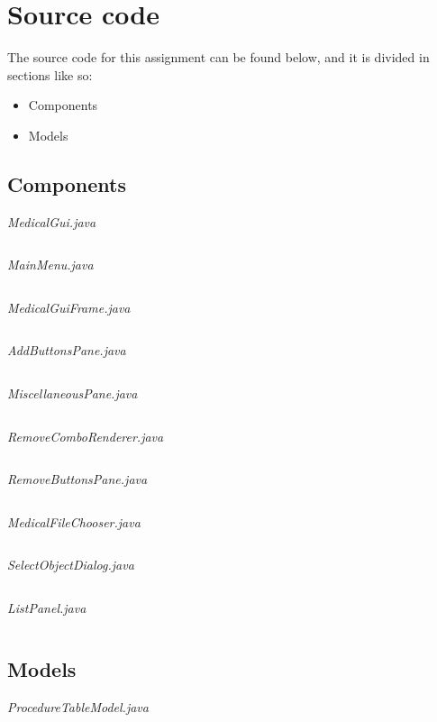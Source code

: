 \documentclass{article}
\begin{document}
\section{Source code}%
\label{sec:source_code}
The source code for this assignment can be found below, and it is divided in sections like so:
\begin{itemize}
  \item Components
  \item Models
\end{itemize}

\subsection{Components}\label{subsec:components} %
\textit{MedicalGui.java}
\inputminted{java}{./src/main/java/com/yvesstraten/medicalconsolegui/MedicalGui.java}

\textit{MainMenu.java}
\inputminted{java}{./src/main/java/com/yvesstraten/medicalconsolegui/components/MainMenu.java}

\textit{MedicalGuiFrame.java}
\inputminted{java}{./src/main/java/com/yvesstraten/medicalconsolegui/components/MedicalGuiFrame.java}

\textit{AddButtonsPane.java}
\inputminted{java}{./src/main/java/com/yvesstraten/medicalconsolegui/components/AddButtonsPane.java}

\textit{MiscellaneousPane.java}
\inputminted{java}{./src/main/java/com/yvesstraten/medicalconsolegui/components/MiscellaneousPane.java}

\textit{RemoveComboRenderer.java}
\inputminted{java}{./src/main/java/com/yvesstraten/medicalconsolegui/RemoveComboRenderer.java}

\textit{RemoveButtonsPane.java}
\inputminted{java}{./src/main/java/com/yvesstraten/medicalconsolegui/components/RemoveButtonsPane.java}

\textit{MedicalFileChooser.java}
\inputminted{java}{./src/main/java/com/yvesstraten/medicalconsolegui/components/MedicalFileChooser.java}

\textit{SelectObjectDialog.java}
\inputminted{java}{./src/main/java/com/yvesstraten/medicalconsolegui/components/SelectObjectDialog.java}

\textit{ListPanel.java}
\inputminted{java}{./src/main/java/com/yvesstraten/medicalconsolegui/components/ListPanel.java}

\subsection{Models}\label{sec:models} %
\textit{ProcedureTableModel.java}
\inputminted{java}{./src/main/java/com/yvesstraten/medicalconsolegui/models/ProcedureTableModel.java}
\end{document}
